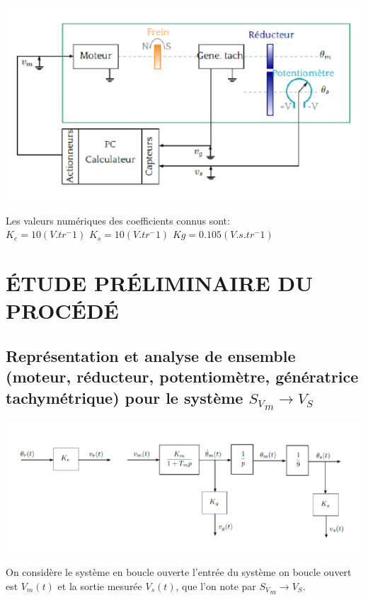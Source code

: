 \documentclass[12pt, a4paper, openany]{report}
\begin{document}
\begin{center}
\includegraphics[scale=0.5]{fiiig1.png}
\label{fig1} 
\end{center}

Les valeurs numériques des coefficients connus sont:\\

 $K_e=10(V.tr^-1)$	 \hfill		$K_s=10(V.tr^-1)$	\hfill		$Kg=0.105(V.s.tr^-1)$ 
 
 
    \section{ÉTUDE PRÉLIMINAIRE DU PROCÉDÉ}
     \subsection{Représentation et analyse de ensemble (moteur, réducteur, potentiomètre, génératrice        tachymétrique) pour le système $ {S_V}_m \rightarrow V_S$ }
 

\begin{center}
\includegraphics[scale=0.5]{fiiig2.png}
\label{fig1} 
\end{center}

On considère le système en boucle ouverte l’entrée du système on boucle ouvert est $V_m(t)$ et la sortie mesurée $V_s(t)$, que l’on note  par $ {S_V}_m \rightarrow V_S$.
\end{document}
